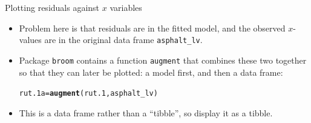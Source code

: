 \documentclass[unknownkeysallowed]{beamer}\usepackage[]{graphicx}\usepackage[]{color}
\makeatletter
\newcommand{\hlstd}[1]{\textcolor[rgb]{0.345,0.345,0.345}{#1}}%
\newcommand{\hlkwb}[1]{\textcolor[rgb]{0.69,0.353,0.396}{#1}}%
\newcommand{\hlkwd}[1]{\textcolor[rgb]{0.737,0.353,0.396}{\textbf{#1}}}%
\newenvironment{kframe}{%
 \def\at@end@of@kframe{}%
 \ifinner\ifhmode%
  \def\at@end@of@kframe{\end{minipage}}%
  \begin{minipage}{\columnwidth}%
 \fi\fi%
 \def\FrameCommand##1{\hskip\@totalleftmargin \hskip-\fboxsep
 \colorbox{shadecolor}{##1}\hskip-\fboxsep
     \hskip-\linewidth \hskip-\@totalleftmargin \hskip\columnwidth}%
 \MakeFramed {\advance\hsize-\width
   \@totalleftmargin\z@ \linewidth\hsize
   \@setminipage}}%
 {\par\unskip\endMakeFramed%
 \at@end@of@kframe}
\newenvironment{knitrout}{}{} %
\makeatother
\begin{document}
\begin{frame}[fragile]{Plotting residuals against $x$ variables}
  
  \begin{itemize}
  \item Problem here is that residuals are in the fitted model, and
    the observed $x$-values are in the original data frame
    \texttt{asphalt\_lv}. 
  \item Package \texttt{broom} contains a function \texttt{augment}
    that combines these two together so that they can later be
    plotted: a model first, and then a data frame:
    
\begin{knitrout}
\color{fgcolor}\begin{kframe}
\begin{alltt}
\hlstd{rut.1a}\hlkwb{=}\hlkwd{augment}\hlstd{(rut.1,asphalt_lv)}
\end{alltt}


{\ttfamily\noindent\color{warningcolor}{\#\# Warning: Deprecated: please use `purrr::possibly()` instead}}

{\ttfamily\noindent\color{warningcolor}{\#\# Warning: Deprecated: please use `purrr::possibly()` instead}}

{\ttfamily\noindent\color{warningcolor}{\#\# Warning: Deprecated: please use `purrr::possibly()` instead}}

{\ttfamily\noindent\color{warningcolor}{\#\# Warning: Deprecated: please use `purrr::possibly()` instead}}

{\ttfamily\noindent\color{warningcolor}{\#\# Warning: Deprecated: please use `purrr::possibly()` instead}}\end{kframe}
\end{knitrout}
\item This is a data frame rather than a ``tibble'', so display it as
  a tibble.
  \end{itemize}
  
\end{frame}
\end{document}
